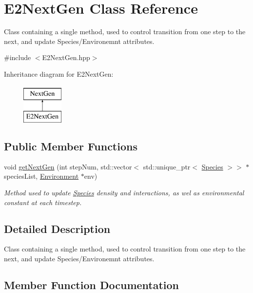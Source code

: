 \hypertarget{classE2NextGen}{}\section{E2\+Next\+Gen Class Reference}
\label{classE2NextGen}


Class containing a single method, used to control transition from one step to the next, and update Species/\+Environemnt attributes.  




{\ttfamily \#include $<$E2\+Next\+Gen.\+hpp$>$}

Inheritance diagram for E2\+Next\+Gen\+:\begin{figure}[H]
\begin{center}
\leavevmode
\includegraphics[height=2.000000cm]{classE2NextGen}
\end{center}
\end{figure}
\subsection*{Public Member Functions}
\begin{DoxyCompactItemize}
\item 
void \hyperlink{classE2NextGen_a2c5d35d9c8f9395cbd58d8fb837a08da}{get\+Next\+Gen} (int step\+Num, std\+::vector$<$ std\+::unique\+\_\+ptr$<$ \hyperlink{classSpecies}{Species} $>$$>$ $\ast$species\+List, \hyperlink{classEnvironment}{Environment} $\ast$env)
\begin{DoxyCompactList}\small\item\em Method used to update \hyperlink{classSpecies}{Species} density and interactions, as wel as environmental constant at each timestep. \end{DoxyCompactList}\end{DoxyCompactItemize}


\subsection{Detailed Description}
Class containing a single method, used to control transition from one step to the next, and update Species/\+Environemnt attributes. 

\subsection{Member Function Documentation}
\hypertarget{classE2NextGen_a2c5d35d9c8f9395cbd58d8fb837a08da}{}\label{classE2NextGen_a2c5d35d9c8f9395cbd58d8fb837a08da} 
